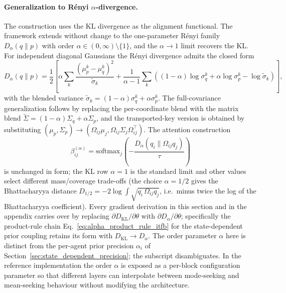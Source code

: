 \documentclass[11pt]{article}
\begin{document}
\paragraph{Generalization to R\'enyi $\alpha$-divergence.}
The construction uses the KL divergence as the alignment functional. The framework extends without change to the one-parameter R\'enyi family $D_\alpha(q \| p)$ with order $\alpha \in (0, \infty) \setminus \{1\}$, and the $\alpha \to 1$ limit recovers the KL. For independent diagonal Gaussians the R\'enyi divergence admits the closed form
\begin{equation}
D_\alpha(q \| p) = \frac{1}{2}\left[ \alpha \sum_k \frac{(\mu_p^k - \mu_q^k)^2}{\tilde\sigma_k} + \frac{1}{\alpha - 1} \sum_k \left((1-\alpha)\log \sigma_q^k + \alpha \log \sigma_p^k - \log \tilde\sigma_k\right) \right],
\label{eq:renyi_diagonal_itfb}
\end{equation}
with the blended variance $\tilde\sigma_k = (1-\alpha)\sigma_q^k + \alpha\sigma_p^k$. The full-covariance generalization follows by replacing the per-coordinate blend with the matrix blend $\tilde\Sigma = (1-\alpha)\Sigma_q + \alpha \Sigma_p$, and the transported-key version is obtained by substituting $(\mu_p, \Sigma_p) \to (\Omega_{ij}\mu_j, \Omega_{ij}\Sigma_j\Omega_{ij}^\top)$. The attention construction
\begin{equation}
\beta_{ij}^{(\alpha)} = \mathrm{softmax}_j\left(-\frac{D_\alpha(q_i \| \Omega_{ij} q_j)}{\tau}\right)
\label{eq:renyi_attention_itfb}
\end{equation}
is unchanged in form; the KL row $\alpha = 1$ is the standard limit and other values select different mass/coverage trade-offs (the choice $\alpha = 1/2$ gives the Bhattacharyya distance $D_{1/2} = -2\log\!\int\!\sqrt{q_i\,\Omega_{ij}q_j}$, i.e.\ minus twice the log of the Bhattacharyya coefficient). Every gradient derivation in this section and in the appendix carries over by replacing $\partial D_{\mathrm{KL}}/\partial \theta$ with $\partial D_\alpha/\partial \theta$; specifically the product-rule chain Eq.~\eqref{eq:alpha_product_rule_itfb} for the state-dependent prior coupling retains its form with $D_{\mathrm{KL}} \to D_\alpha$. The order parameter $\alpha$ here is distinct from the per-agent prior precision $\alpha_i$ of Section~\ref{sec:state_dependent_precision}; the subscript disambiguates. In the reference implementation the order $\alpha$ is exposed as a per-block configuration parameter so that different layers can interpolate between mode-seeking and mean-seeking behaviour without modifying the architecture.
\end{document}
